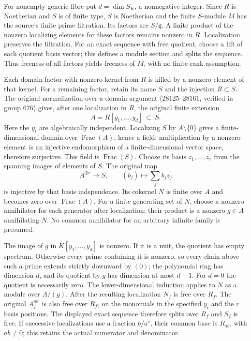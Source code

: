 For nonempty generic fibre put \(d=\dim S_K\), a nonnegative integer. Since \(R\) is Noetherian and \(S\) is of finite type, \(S\) is Noetherian and the finite \(S\)-module \(M\) has the source's finite prime filtration. Its factors are \(S/\mathfrak q\). A finite product of the nonzero localizing elements for these factors remains nonzero in \(R\). Localization preserves the filtration. For an exact sequence with free quotient, choose a lift of each quotient basis vector; this defines a module section and splits the sequence. Thus freeness of all factors yields freeness of \(M\), with no finite-rank assumption.

Each domain factor with nonzero kernel from \(R\) is killed by a nonzero element of that kernel. For a remaining factor, retain its name \(S\) and the injection \(R\subset S\). The original normalization-over-a-domain argument (28125--28161, verified in group 676) gives, after one localization in \(R\), the original finite extension \[
 A=R[y_1,\ldots,y_d]\ \subset\ S.
\] Here the \(y_i\) are algebraically independent. Localizing \(S\) by \(A\setminus\{0\}\) gives a finite-dimensional domain over \(\operatorname{Frac}(A)\), hence a field: multiplication by a nonzero element is an injective endomorphism of a finite-dimensional vector space, therefore surjective. This field is \(\operatorname{Frac}(S)\). Choose its basis \(z_1,\ldots,z_r\) from the spanning images of elements of \(S\). The original map \[
 A^{\oplus r}\longrightarrow S,\qquad (b_j)\longmapsto\sum_j b_jz_j
\] is injective by that basis independence. Its cokernel \(N\) is finite over \(A\) and becomes zero over \(\operatorname{Frac}(A)\). For a finite generating set of \(N\), choose a nonzero annihilator for each generator after localization; their product is a nonzero \(g\in A\) annihilating \(N\). No common annihilator for an arbitrary infinite family is presumed.

The image of \(g\) in \(K[y_1,\ldots,y_d]\) is nonzero. If it is a unit, the quotient has empty spectrum. Otherwise every prime containing it is nonzero, so every chain above such a prime extends strictly downward by \((0)\); the polynomial ring has dimension \(d\), and its quotient by \(g\) has dimension at most \(d-1\). For \(d=0\) the quotient is necessarily zero. The lower-dimensional induction applies to \(N\) as a module over \(A/(g)\). After the resulting localization \(N_f\) is free over \(R_f\). The original \(A_f^{\oplus r}\) is also free over \(R_f\), on the monomials in the specified \(y_i\) and the \(r\) basis positions. The displayed exact sequence therefore splits over \(R_f\) and \(S_f\) is free. If successive localizations use a fraction \(b/a^v\), their common base is \(R_{ab}\), with \(ab\ne0\); this retains the actual numerator and denominator.

